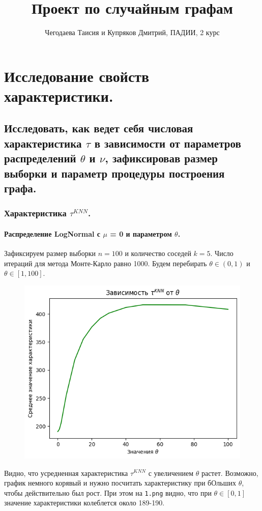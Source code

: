 \documentclass{report}
\title{Проект по случайным графам}
\author{Чегодаева Таисия и Купряков Дмитрий, ПАДИИ, 2 курс}
\begin{document}
\maketitle

\part{Исследование свойств характеристики.}
\chapter{Исследовать, как ведет себя числовая характеристика $\tau$ в зависимости от параметров распределений $\theta$ и $\nu$, зафиксировав размер выборки и параметр процедуры построения графа.}
\section{Характеристика $\tau^{KNN}$.}
\subsection{Распределение LogNormal с $\mu$ = 0 и параметром $\theta$.}
Зафиксируем размер выборки $n = 100$ и количество соседей $k = 5$. Число итераций для метода Монте-Карло равно 1000.
\newline
\newline
Будем перебирать $\theta \in (0, 1)$ и $\theta \in [1, 100]$.
\newline
\newline
\begin{figure}[h]
    \centering
    \includegraphics[width=0.5\linewidth]{2.png}
\end{figure}
\newline
\newline
Видно, что усредненная характеристика $\tau^{KNN}$ с увеличением $\theta$ растет. Возможно, график немного корявый и нужно посчитать характеристику при бОльших $\theta$, чтобы действительно был рост.
\newline
\newline
При этом на \texttt{1.png} видно, что при $\theta \in [0, 1]$ значение характеристики колеблется около 189-190.
\end{document}
